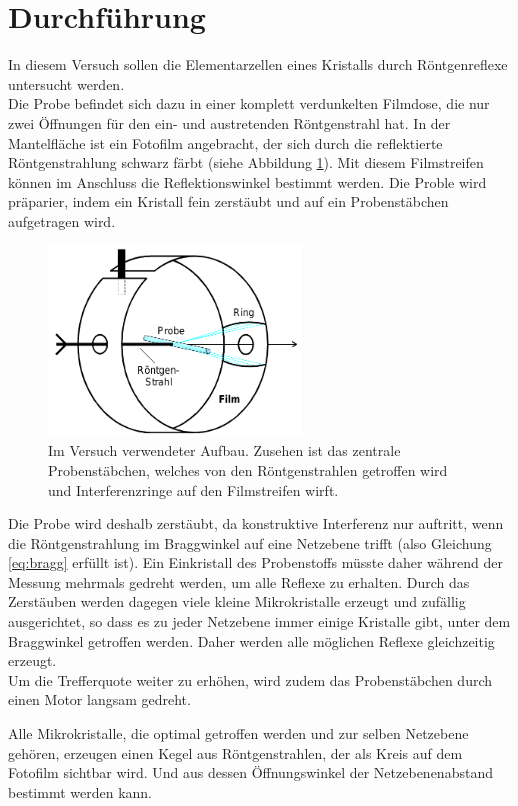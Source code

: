 \section{Durchführung}
In diesem Versuch sollen die Elementarzellen eines Kristalls durch Röntgenreflexe untersucht werden.\\
Die Probe befindet sich dazu in einer komplett verdunkelten Filmdose, die nur zwei Öffnungen für den ein- und austretenden Röntgenstrahl hat. In der Mantelfläche ist ein Fotofilm angebracht, der sich durch die reflektierte Röntgenstrahlung schwarz färbt (siehe Abbildung \ref{pic:aufbau}). Mit diesem Filmstreifen können im Anschluss die Reflektionswinkel bestimmt werden. 
Die Proble wird präparier, indem ein Kristall fein zerstäubt und auf ein Probenstäbchen aufgetragen wird.
\begin{figure}[htbp]
	\includegraphics[width=0.6\textwidth]{../pics/aufbau.png}
	\caption{Im Versuch verwendeter Aufbau. Zusehen ist das zentrale Probenstäbchen, welches von den Röntgenstrahlen getroffen wird und Interferenzringe auf den Filmstreifen wirft.}
	\label{pic:aufbau}
\end{figure}
Die Probe wird deshalb zerstäubt, da konstruktive Interferenz nur auftritt, wenn die Röntgenstrahlung im Braggwinkel auf eine Netzebene trifft (also Gleichung \ref{eq:bragg} erfüllt ist). Ein Einkristall des Probenstoffs müsste daher während der Messung mehrmals gedreht werden, um alle Reflexe zu erhalten. Durch das Zerstäuben werden dagegen viele kleine Mikrokristalle erzeugt und zufällig ausgerichtet, so dass es zu jeder Netzebene immer einige Kristalle gibt, unter dem Braggwinkel getroffen werden. Daher werden alle möglichen Reflexe gleichzeitig erzeugt.\\
Um die Trefferquote weiter zu erhöhen, wird zudem das Probenstäbchen durch einen Motor langsam gedreht. 

Alle Mikrokristalle, die optimal getroffen werden und zur selben Netzebene gehören, erzeugen einen Kegel aus Röntgenstrahlen, der als Kreis auf dem Fotofilm sichtbar wird. Und aus dessen Öffnungswinkel der Netzebenenabstand bestimmt werden kann.

